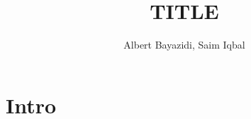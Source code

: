 \documentclass{article}
\title{TITLE}
\author{Albert Bayazidi, Saim Iqbal}
\begin{document}
\maketitle  
\tableofcontents

\section{Intro}

\newpage
\end{document}
